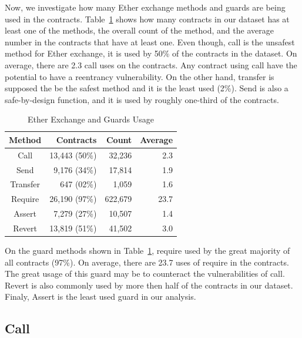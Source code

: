\documentclass[10pt,conference]{IEEEtran}
\begin{document}
Now, we investigate how many Ether exchange methods and guards are being used in the contracts. Table~\ref{tab:results-all} shows how many contracts in our dataset has at least one of the methods, the overall count of the method, and the average number in the contracts that have at least one.  Even though, call is the unsafest method for Ether exchange,  it is used by 50\% of the contracts in the dataset.  On average, there are 2.3 call uses on the contracts.  Any contract using call have the potential to have a reentrancy vulnerability.  On the other hand, transfer is supposed the be the safest method and it is the least used (2\%). Send is also a safe-by-design function, and it is used by roughly one-third of the contracts. 

\begin{table}
\center
  \caption{Ether Exchange and Guards Usage}
  \label{tab:results-all}
  \begin{tabular}{crrr}
    \hline
    Method & Contracts & Count & Average \\
    \hline
    Call & 13,443 (50\%) & 32,236 & 2.3 \\
    Send & 9,176 (34\%) & 17,814 & 1.9 \\
    Transfer & 647 (02\%) & 1,059& 1.6 \\
    Require & 26,190 (97\%) & 622,679 & 23.7 \\
    Assert & 7,279 (27\%) & 10,507 & 1.4 \\
    Revert & 13,819 (51\%) & 41,502 & 3.0\\
    \hline
\end{tabular}
\end{table}

On the guard methods shown in Table~\ref{tab:results-all}, require used by the great majority of all contracts (97\%).  On average, there are 23.7 uses of require in the contracts. The great usage of this guard may be to counteract the vulnerabilities of call.  Revert is also commonly used by more then half of the contracts in our dataset.  Finaly,  Assert is the least used guard in our analysis.

\subsection{Call}
\end{document}
